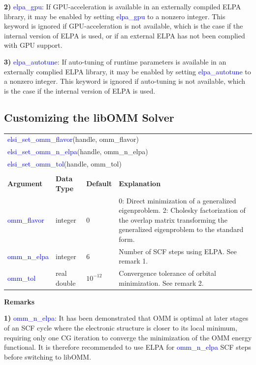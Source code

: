 \documentclass{report}
\newcommand{\tcb}[1]{\textcolor{blue}{#1}}
\begin{document}
\textbf{2)} \tcb{elpa\_gpu}: If GPU-acceleration is available in an externally compiled ELPA library, it may be enabled by setting \tcb{elpa\_gpu} to a nonzero integer. This keyword is ignored if GPU-acceleration is not available, which is the case if the internal version of ELPA is used, or if an external ELPA has not been complied with GPU support.

\textbf{3)} \tcb{elpa\_autotune}: If auto-tuning of runtime parameters is available in an externally complied ELPA library, it may be enabled by setting \tcb{elpa\_autotune} to a nonzero integer. This keyword is ignored if auto-tuning is not available, which is the case if the internal version of ELPA is used.

\subsection{Customizing the libOMM Solver}
\label{subsec:setter_omm}
\begin{tabular}[]{|p{30mm}|p{20mm}|p{15mm}|p{100mm}|}
\multicolumn{4}{l}{\tcb{elsi\_set\_omm\_flavor}(handle, omm\_flavor)}\\
\multicolumn{4}{l}{\tcb{elsi\_set\_omm\_n\_elpa}(handle, omm\_n\_elpa)}\\
\multicolumn{4}{l}{\tcb{elsi\_set\_omm\_tol}(handle, omm\_tol)}\\
\multicolumn{4}{l}{}\\
\hline
\multicolumn{1}{|l|}{\textbf{Argument}} & \multicolumn{1}{l|}{\textbf{Data Type}} & \multicolumn{1}{l|}{\textbf{Default}} & \multicolumn{1}{l|}{\textbf{Explanation}}\\
\hline
\tcb{omm\_flavor}  & integer     & 0          & 0: Direct minimization of a generalized eigenproblem. 2: Cholesky factorization of the overlap matrix transforming the generalized eigenproblem to the standard form.\\
\hline
\tcb{omm\_n\_elpa} & integer     & 6          & Number of SCF steps using ELPA. See remark 1.\\
\hline
\tcb{omm\_tol}     & real double & $10^{-12}$ & Convergence tolerance of orbital minimization. See remark 2.\\
\hline
\end{tabular}

\textbf{Remarks}

\textbf{1)} \tcb{omm\_n\_elpa}: It has been demonstrated that OMM is optimal at later stages of an SCF cycle where the electronic structure is closer to its local minimum, requiring only one CG iteration to converge the minimization of the OMM energy functional. It is therefore recommended to use ELPA for \tcb{omm\_n\_elpa} SCF steps before switching to libOMM.
\end{document}
